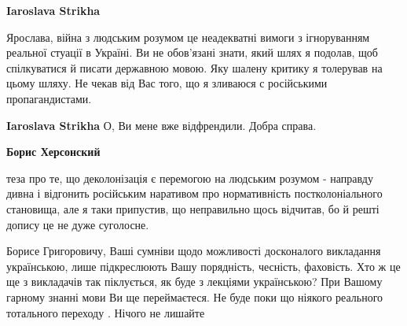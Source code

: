 \begin{itemize}
\begin{itemize}
 
\textbf{Iaroslava Strikha} 

Ярослава, війна з людським розумом це неадекватні вимоги з ігноруванням
реальної стуації в Україні. Ви не обов'язані знати, який шлях я подолав, щоб
спілкуватися й писати державною мовою. Яку шалену критику я толерував на цьому
шляху. Не чекав від Вас того, що я зливаюся с російськими пропагандистами.


 
\textbf{Iaroslava Strikha} О, Ви мене вже відфрендили. Добра справа.

 

\textbf{Борис Херсонский} 

теза про те, що деколонізація є перемогою на людським розумом - направду дивна
і відгонить російським наративом про нормативність постколоніального становища,
але я таки припустив, що неправильно щось відчитав, бо й решті допису це не
дуже суголосне.

\end{itemize}

 

Борисе Григоровичу, Ваші сумніви щодо можливості досконалого викладання
українською, лише підкреслюють Вашу порядність, чесність, фаховість. Хто ж це
ще з викладачів так піклується, як буде з лекціями українською? При Вашому
гарному знанні мови Ви ще переймаєтеся. Не буде поки що ніякого реального
тотального переходу . Нічого не лишайте


 


\end{itemize}

